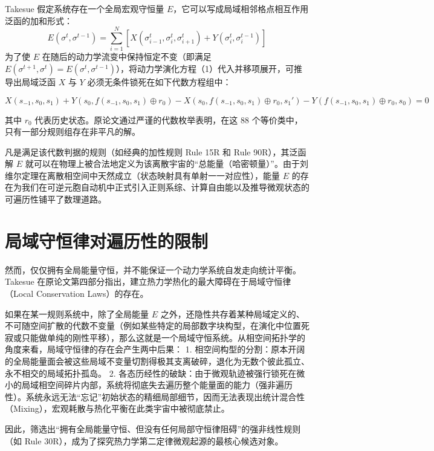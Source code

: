 \documentclass[reprint, amsmath, amssymb, aps, physrev,prb]{revtex4-2}
\begin{document}
Takesue 假定系统存在一个全局宏观守恒量 $E$，它可以写成局域相邻格点相互作用泛函的加和形式：
\begin{equation}
E(\sigma^t, \sigma^{t-1}) = \sum_{i=1}^{N} \left[ X(\sigma_{i-1}^t, \sigma_i^t, \sigma_{i+1}^t) + Y(\sigma_i^t, \sigma_i^{t-1}) \right]
\end{equation}
为了使 $E$ 在随后的动力学流变中保持恒定不变（即满足 $E(\sigma^{t+1}, \sigma^t) = E(\sigma^t, \sigma^{t-1})$），将动力学演化方程（1）代入并移项展开，可推导出局域泛函 $X$ 与 $Y$ 必须无条件锁死在如下代数方程组中：

\begin{equation}
X(s_{-1}, s_0, s_1) + Y(s_0, f(s_{-1}, s_0, s_1) \oplus r_0) - X(s_0, f(s_{-1}, s_0, s_1) \oplus r_0, s_1') - Y(f(s_{-1}, s_0, s_1) \oplus r_0, s_0) = 0
\end{equation}

其中 $r_0$ 代表历史状态。原论文通过严谨的代数枚举表明，在这 88 个等价类中，只有一部分规则组存在非平凡的解。

凡是满足该代数判据的规则（如经典的加性规则 Rule 15R 和 Rule 90R），其泛函解 $E$ 就可以在物理上被合法地定义为该离散宇宙的“总能量（哈密顿量）”。由于刘维尔定理在离散相空间中天然成立（状态映射具有单射一一对应性），能量 $E$ 的存在为我们在可逆元胞自动机中正式引入正则系综、计算自由能以及推导微观状态的可遍历性铺平了数理道路。

\section{局域守恒律对遍历性的限制}

然而，仅仅拥有全局能量守恒，并不能保证一个动力学系统自发走向统计平衡。Takesue 在原论文第四部分指出，建立热力学热化的最大障碍在于局域守恒律（Local Conservation Laws）的存在。

如果在某一规则系统中，除了全局能量 $E$ 之外，还隐性共存着某种局域定义的、不可随空间扩散的代数不变量（例如某些特定的局部数字块构型，在演化中位置死寂或只能做单纯的刚性平移），那么这就是一个局域守恒系统。从相空间拓扑学的角度来看，局域守恒律的存在会产生两中后果：
1. 相空间构型的分割：原本开阔的全局能量面会被这些局域不变量切割得极其支离破碎，退化为无数个彼此孤立、永不相交的局域拓扑孤岛。
2. 各态历经性的破缺：由于微观轨迹被强行锁死在微小的局域相空间碎片内部，系统将彻底失去遍历整个能量面的能力（强非遍历性）。系统永远无法“忘记”初始状态的精细局部细节，因而无法表现出统计混合性（Mixing），宏观耗散与热化平衡在此类宇宙中被彻底禁止。

因此，筛选出“拥有全局能量守恒、但没有任何局部守恒律阻碍”的强非线性规则（如 Rule 30R），成为了探究热力学第二定律微观起源的最核心候选对象。
\end{document}
